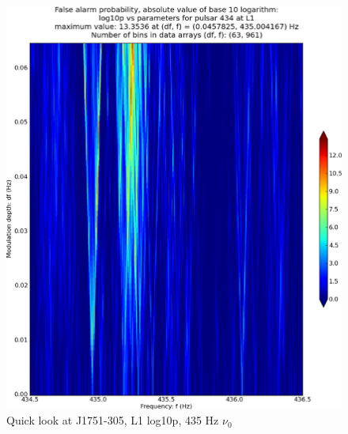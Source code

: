\begin{figure}
\begin{center}
\includegraphics[width=0.4\paperwidth,height=0.2\paperheight]{plots/DFvsFresultsProb-L1_pulsar-434.eps}
\caption{
Quick look at J1751-305, L1 log10p, 435 Hz $\nu_0$}
\end{center}
\end{figure}


